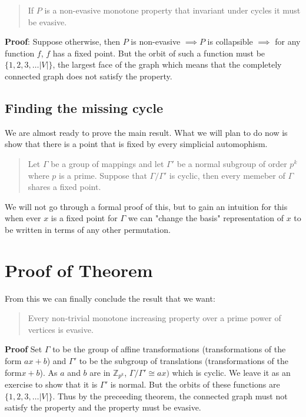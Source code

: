\documentclass[a4paper]{article}
\begin{document}
\begin{quote}
    If $P$ is a non-evasive monotone property that invariant under cycles it must be evasive.
\end{quote}

\textbf{Proof}: Suppose otherwise, then $P$ is non-evasive $\implies P$ is collapsible $\implies$ for any function $f$, $f$ has a fixed point. But the orbit of such a function must be $\{1, 2, 3, \ldots |V| \}$, the largest face of the graph which means that the completely connected graph does not satisfy the property.

\subsection{Finding the missing cycle}

We are almost ready to prove the main result. What we will plan to do now is show that there is a point that is fixed by every simplicial automophism.

\begin{quote}
    Let $\Gamma$ be a group of mappings and let $\Gamma'$ be a normal subgroup of order $p^k$ where $p$ is a prime. Suppose that $\Gamma/\Gamma'$ is cyclic, then every memeber of $\Gamma$ shares a fixed point.
\end{quote}

We will not go through a formal proof of this, but to gain an intuition for this when ever $x$ is a fixed point for $\Gamma$ we can "change the basis" representation of $x$ to be written in terms of any other permutation.

\section{Proof of Theorem}

From this we can finally conclude the result that we want:

\begin{quote}
    Every non-trivial monotone increasing property over a prime power of vertices is evasive.
\end{quote}

\textbf{Proof} Set $\Gamma$ to be the group of affine transformations (transformations of the form $ax + b$) and $\Gamma'$ to be the subgroup of translations (transformations of the form$x + b$). As $a$ and $b$ are in $\mathbb{Z}_{p^k}$, $\Gamma/\Gamma' \cong ax)$ which is cyclic. We leave it as an exercise to show that it is $\Gamma'$ is normal. But the orbits of these functions are $\{ 1, 2, 3, \ldots |V| \}$. Thus by the preceeding theorem, the connected graph must not satisfy the property and the property must be evasive.
\end{document}
